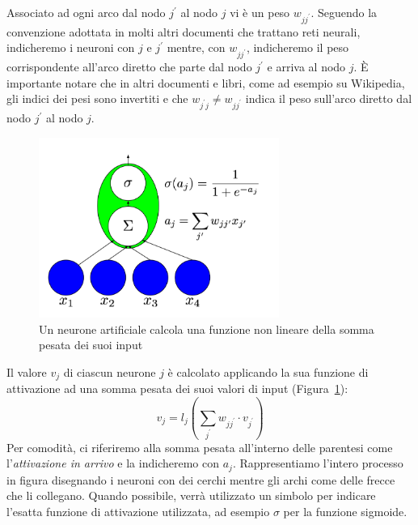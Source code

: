 Associato ad ogni arco dal nodo $j^{'}$ al nodo $j$ vi \`e un peso $w_{jj^{'}}$.
Seguendo la convenzione adottata in molti altri documenti che trattano reti neurali,
indicheremo i neuroni con $j$ e $j^{'}$ mentre, con $w_{jj^{'}}$, indicheremo il
peso corrispondente all'arco diretto che parte dal nodo $j^{'}$ e arriva al nodo $j$.
\`E importante notare che in altri documenti e libri, come ad esempio su Wikipedia,
gli indici dei pesi sono invertiti e che $w_{j^{'}j} \neq w_{jj^{'}}$ indica il
peso sull'arco diretto dal nodo $j^{'}$ al nodo $j$.

\begin{figure}[tp]
  \centering
  \begin{center}
    \includegraphics[width=0.7\textwidth]{./images/artificialNeuron.png}
  \end{center}
  \caption{Un neurone artificiale calcola una funzione non lineare della somma
  pesata dei suoi input}
  \label{fig:artificialNeuron}
\end{figure}

Il valore $v_j$ di ciascun neurone $j$ \`e calcolato applicando la sua funzione
di attivazione ad una somma pesata dei suoi valori di input
(Figura~\ref{fig:artificialNeuron}):
\begin{equation} %
  v_j = l_j\left( \sum_{j^{'}} w_{jj^{'}} \cdot v_{j^{'}} \right)
\end{equation}
Per comodit\`a, ci riferiremo alla somma pesata all'interno delle parentesi come
l'\emph{attivazione in arrivo} e la indicheremo con $a_j$. Rappresentiamo
l'intero processo in figura disegnando i neuroni con dei cerchi mentre gli archi
come delle frecce che li collegano. Quando possibile, verr\`a utilizzato un simbolo
per indicare l'esatta funzione di attivazione utilizzata, ad esempio $\sigma$ per
la funzione sigmoide.

